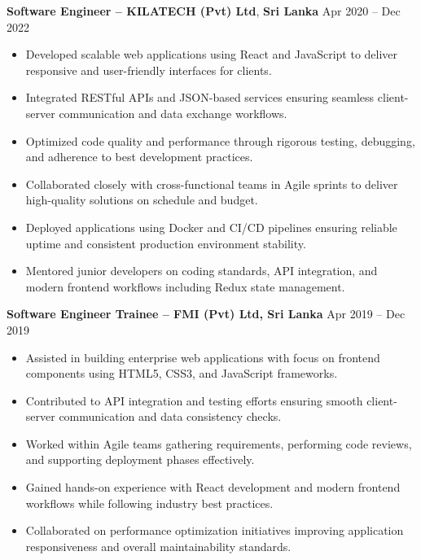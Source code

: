\documentclass[10pt,letterpaper]{article}
\begin{document}
\vspace{-2pt}

\textbf{Software Engineer -- KILATECH (Pvt) Ltd}, \textbf{Sri Lanka} \hfill Apr 2020 -- Dec 2022

\vspace{-1pt}

\begin{itemize}
\item Developed scalable web applications using React and JavaScript to deliver responsive and user-friendly interfaces for clients.
\item Integrated RESTful APIs and JSON-based services ensuring seamless client-server communication and data exchange workflows.
\item Optimized code quality and performance through rigorous testing, debugging, and adherence to best development practices.
\item Collaborated closely with cross-functional teams in Agile sprints to deliver high-quality solutions on schedule and budget.
\item Deployed applications using Docker and CI/CD pipelines ensuring reliable uptime and consistent production environment stability.
\item Mentored junior developers on coding standards, API integration, and modern frontend workflows including Redux state management.
\end{itemize}

\textbf{Software Engineer Trainee -- FMI (Pvt) Ltd, Sri Lanka} \hfill Apr 2019 -- Dec 2019

\vspace{-1pt}

\begin{itemize}
\item Assisted in building enterprise web applications with focus on frontend components using HTML5, CSS3, and JavaScript frameworks.
\item Contributed to API integration and testing efforts ensuring smooth client-server communication and data consistency checks.
\item Worked within Agile teams gathering requirements, performing code reviews, and supporting deployment phases effectively.
\item Gained hands-on experience with React development and modern frontend workflows while following industry best practices.
\item Collaborated on performance optimization initiatives improving application responsiveness and overall maintainability standards.
\end{itemize}
\end{document}
